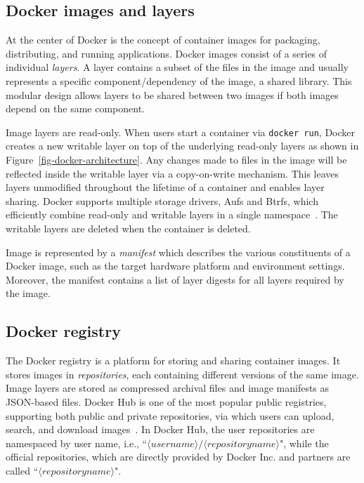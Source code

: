 \subsection{Docker images and layers}
\label{sec-image-layers}

At the center of Docker is the concept of container images for packaging,
distributing, and running applications.
Docker images consist of a series of individual \emph{layers}.
A layer contains a subset of the files in the image and 
usually represents a specific component/dependency of the image, \eg a shared library.
This modular design allows layers to be shared between two images if both
images depend on the same component.

Image layers are read-only. When users start a
container via {\tt docker run}, Docker creates a new writable layer on top of the
underlying read-only layers as shown in Figure~\ref{fig-docker-architecture}. Any changes made
to files in the image will be reflected inside the writable layer via a copy-on-write mechanism.
This leaves layers unmodified throughout the lifetime of a container and enables layer
sharing.
%
Docker supports multiple storage drivers, \eg Aufs and Btrfs, which
efficiently combine read-only and writable layers
in a single namespace~\cite{docker-driver-eval}.
The writable layers are deleted when the container is deleted.

Image is represented by a \emph{manifest}
which describes the various constituents of a Docker image, such as the
target hardware platform and environment settings.
%
Moreover, the manifest contains a list of layer digests for all layers required by the image.


\subsection{Docker registry}
\label{sec:docker-registry}

The Docker registry is a platform for storing and sharing container
images. It stores images in \emph{repositories}, each containing
different versions of the same image.
%
Image layers are stored as compressed archival files and image
manifests as JSON-based files.
%
Docker Hub is one of the most popular public registries,
supporting both public and private repositories,
via which users can upload, search, and download images~\cite{docker-hub}.
In Docker Hub, the user repositories are namespaced by user name, i.e.,
``$\langle username\rangle/\langle repository name \rangle$",
while the official repositories, which
are directly provided by Docker Inc. and partners are called
``$\langle repository name \rangle$".

